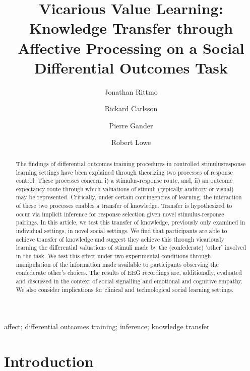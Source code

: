 \documentclass[]{elsarticle} %
\begin{document}
\begin{frontmatter}

  \title{Vicarious Value Learning: Knowledge Transfer through Affective
Processing on a Social Differential Outcomes Task}
    \author[UOE]{Jonathan Rittmo}
    \author[GU]{Rickard Carlsson}
    \author[GU]{Pierre Gander}
    \author[GU]{Robert Lowe}
      \address[UOE]{School of Philosophy, Psychology and Language Sciences, University of
Edinburgh, Edinburgh, UK}
    \address[GU]{Department of Applied IT, University of Gothenburg, Gothenburg, Sweden}
  
  \begin{abstract}
  The findings of differential outcomes training procedures in controlled
  stimulusresponse learning settings have been explained through
  theorizing two processes of response control. These processes concern:
  i) a stimulus-response route, and, ii) an outcome expectancy route
  through which valuations of stimuli (typically auditory or visual) may
  be represented. Critically, under certain contingencies of learning, the
  interaction of these two processes enables a transfer of knowledge.
  Transfer is hypothesized to occur via implicit inference for response
  selection given novel stimulus-response pairings. In this article, we
  test this transfer of knowledge, previously only examined in individual
  settings, in novel social settings. We find that participants are able
  to achieve transfer of knowledge and suggest they achieve this through
  vicariously learning the differential valuations of stimuli made by the
  (confederate) `other' involved in the task. We test this effect under
  two experimental conditions through manipulation of the information made
  available to participants observing the confederate other's choices. The
  results of EEG recordings are, additionally, evaluated and discussed in
  the context of social signalling and emotional and cognitive empathy. We
  also consider implications for clinical and technological social
  learning settings.
  \end{abstract}
   \begin{keyword} affect; differential outcomes training; inference; knowledge transfer\end{keyword}
 \end{frontmatter}

\hypertarget{introduction}{%
\section{Introduction}\label{introduction}}
\end{document}
